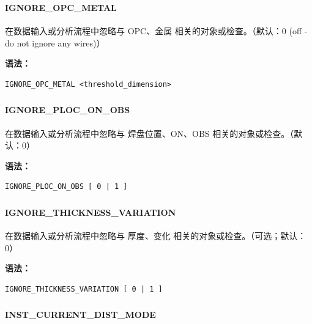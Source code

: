 \subsubsection{}
\paragraph*{IGNORE_OPC_METAL}

在数据输入或分析流程中忽略与 OPC、金属 相关的对象或检查。（默认：0 (off - do not ignore any wires)）

\textbf{语法：}
\begin{lstlisting}
IGNORE_OPC_METAL <threshold_dimension>
\end{lstlisting}

\subsubsection{}
\paragraph*{IGNORE_PLOC_ON_OBS}

在数据输入或分析流程中忽略与 焊盘位置、ON、OBS 相关的对象或检查。（默认：0）

\textbf{语法：}
\begin{lstlisting}
IGNORE_PLOC_ON_OBS [ 0 | 1 ]
\end{lstlisting}

\subsubsection{}
\paragraph*{IGNORE_THICKNESS_VARIATION}

在数据输入或分析流程中忽略与 厚度、变化 相关的对象或检查。（可选；默认：0）

\textbf{语法：}
\begin{lstlisting}
IGNORE_THICKNESS_VARIATION [ 0 | 1 ]
\end{lstlisting}

\subsubsection{}
\paragraph*{INST_CURRENT_DIST_MODE}

